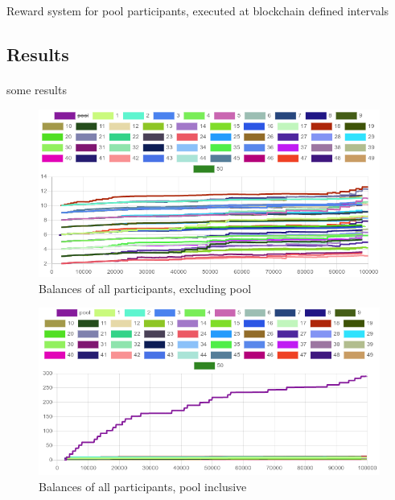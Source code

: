 \begin{algorithm}[H]
  \caption{Reward system for pool participants, executed at blockchain defined intervals}
  \label{algorithm:reward}
  \begin{algorithmic}[1]
     
         
      \EndFor
    \EndProcedure
  \end{algorithmic}
\end{algorithm}

\subsection{Results}

\paragraph{} some results

\begin{figure}[H]
  \centering
  \caption{Balances of all participants, excluding pool}
  \label{figure:balances}
  \includegraphics[width=\linewidth]{media/fig-balances}
\end{figure}

\begin{figure}[H]
  \centering
  \caption{Balances of all participants, pool inclusive}
  \label{figure:balances-pool}
  \includegraphics[width=\linewidth]{media/fig-balances-pool}
\end{figure}

